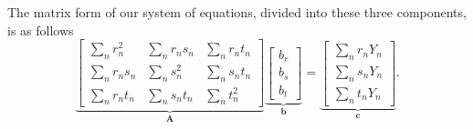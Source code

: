 \documentclass[12pt,oneside,openany]{book}
\begin{document}
The matrix form of our system of equations, divided into these three
components, is as follows \[
\underbrace{\begin{bmatrix}
\sum_n r_n^2 & \sum_n r_n s_n & \sum_n r_n t_n \\
\sum_n r_n s_n & \sum_n s_n^2 & \sum_n s_n t_n \\
\sum_n r_n t_n & \sum_n s_n t_n & \sum_n t_n^2
\end{bmatrix}}_{\mathbf{A}}
\underbrace{\begin{bmatrix}
b_r \\ b_s \\ b_t
\end{bmatrix}}_{\mathbf{b}}
=
\underbrace{\begin{bmatrix}
\sum_n r_n Y_n \\ \sum_n s_n Y_n \\ \sum_n t_n Y_n
\end{bmatrix}}_{\mathbf{c}}.
\]
\end{document}
